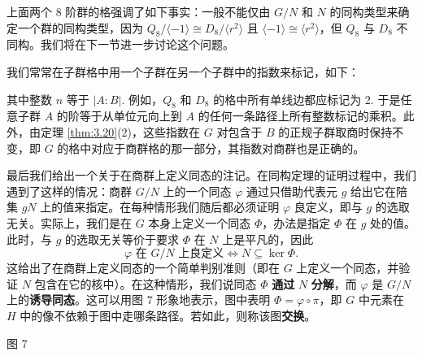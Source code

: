 \begin{example}
上面两个 8 阶群的格强调了如下事实：一般不能仅由 \(G/N\) 和 \(N\) 的同构类型来确定一个群的同构类型，因为 \(Q_8/\langle -1 \rangle \cong D_8/\langle r^2 \rangle\) 且 \(\langle -1 \rangle \cong \langle r^2 \rangle\)，但 \(Q_8\) 与 \(D_8\) 不同构。我们将在下一节进一步讨论这个问题。

我们常常在子群格中用一个子群在另一个子群中的指数来标记，如下：

\begin{center}
\end{center}

其中整数 \(n\) 等于 \(|A : B|\). 例如，\(Q_8\) 和 \(D_8\) 的格中所有单线边都应标记为 2. 于是任意子群 \(A\) 的阶等于从单位元向上到 \(A\) 的任何一条路径上所有整数标记的乘积。此外，由定理 \ref{thm:3.20}(2)，这些指数在 \(G\) 对包含于 \(B\) 的正规子群取商时保持不变，即 \(G\) 的格中对应于商群格的那一部分，其指数对商群也是正确的。
\end{example}

最后我们给出一个关于在商群上定义同态的注记。在同构定理的证明过程中，我们遇到了这样的情况：商群 \(G/N\) 上的一个同态 \(\varphi\) 通过只借助代表元 \(g\) 给出它在陪集 \(gN\) 上的值来指定。在每种情形我们随后都必须证明 \(\varphi\) 良定义，即与 \(g\) 的选取无关。实际上，我们是在 \(G\) 本身上定义一个同态 \(\Phi\)，办法是指定 \(\Phi\) 在 \(g\) 处的值。此时，与 \(g\) 的选取无关等价于要求 \(\Phi\) 在 \(N\) 上是平凡的，因此
\[
\varphi \text{ 在 } G/N \text{ 上良定义} \iff N \subseteq \ker \Phi.
\]
这给出了在商群上定义同态的一个简单判别准则（即在 \(G\) 上定义一个同态，并验证 \(N\) 包含在它的核中）。在这种情形，我们说同态 \(\Phi\) \textbf{通过} \(N\) \textbf{分解}，而 \(\varphi\) 是 \(G/N\) 上的\textbf{诱导同态}。这可以用图 7 形象地表示，图中表明 \(\Phi = \varphi \circ \pi\)，即 \(G\) 中元素在 \(H\) 中的像不依赖于图中走哪条路径。若如此，则称该图\textbf{交换}。

\begin{center}

图 7
\end{center}

